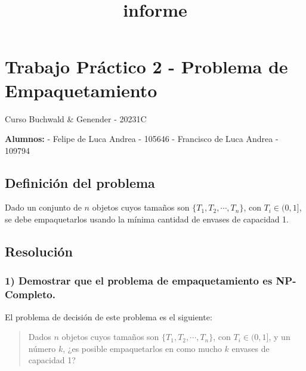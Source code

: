 \documentclass[11pt]{article}
\title{informe}
\begin{document}
    
    \maketitle
    
    

    
    \hypertarget{trabajo-pruxe1ctico-2---problema-de-empaquetamiento}{%
\section{Trabajo Práctico 2 - Problema de
Empaquetamiento}\label{trabajo-pruxe1ctico-2---problema-de-empaquetamiento}}

    Curso Buchwald \& Genender - 20231C

\textbf{Alumnos:} - Felipe de Luca Andrea - 105646 - Francisco de Luca
Andrea - 109794

    \hypertarget{definiciuxf3n-del-problema}{%
\subsection{Definición del problema}\label{definiciuxf3n-del-problema}}

Dado un conjunto de \(n\) objetos cuyos tamaños son
\(\{T_1, T_2, \dotsb , T_n\}\), con \(T_i \in (0, 1]\), se debe
empaquetarlos usando la mínima cantidad de envases de capacidad 1.

    \hypertarget{resoluciuxf3n}{%
\subsection{Resolución}\label{resoluciuxf3n}}

    \hypertarget{demostrar-que-el-problema-de-empaquetamiento-es-np-completo.}{%
\subsubsection{1) Demostrar que el problema de empaquetamiento es
NP-Completo.}\label{demostrar-que-el-problema-de-empaquetamiento-es-np-completo.}}

    El problema de decisión de este problema es el siguiente:

\begin{quote}
Dados \(n\) objetos cuyos tamaños son \(\{T_1, T_2, \dotsb , T_n\}\),
con \(T_i \in (0, 1]\), y un número \(k\), ¿es posible empaquetarlos en
como mucho \(k\) envases de capacidad 1?
\end{quote}
\end{document}
